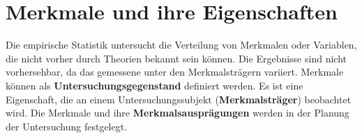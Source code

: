 \section{Merkmale und ihre Eigenschaften}
Die empirische Statistik untersucht die Verteilung von Merkmalen oder Variablen, die nicht vorher durch Theorien bekannt sein können.
Die Ergebnisse sind nicht vorhersehbar, da das gemessene unter den Merkmalsträgern variiert.
\newline
Merkmale können als \textbf{Untersuchungsgegenstand} definiert werden. Es ist eine Eigenschaft, die an einem Untersuchungssubjekt (\textbf{Merkmalsträger}) beobachtet wird.
Die Merkmale und ihre \textbf{Merkmalsausprägungen} werden in der Planung der Untersuchung festgelegt.

